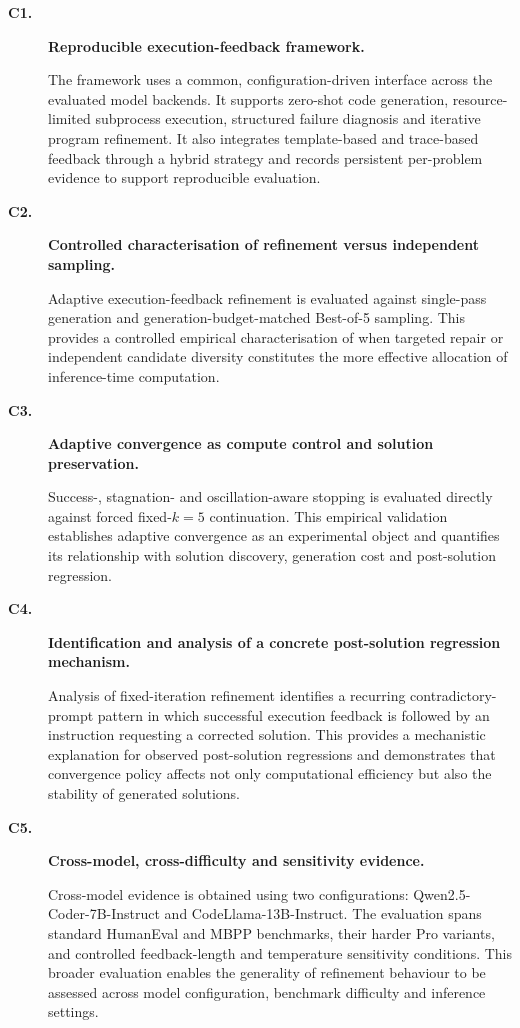 \begin{description}

\item[\textbf{C1.}] \textbf{Reproducible execution-feedback framework.}\par The framework uses a common, configuration-driven interface across the evaluated model backends. It supports zero-shot code generation, resource-limited subprocess execution, structured failure diagnosis and iterative program refinement. It also integrates template-based and trace-based feedback through a hybrid strategy and records persistent per-problem evidence to support reproducible evaluation.

\item[\textbf{C2.}] \textbf{Controlled characterisation of refinement versus independent sampling.}\par Adaptive execution-feedback refinement is evaluated against single-pass generation and generation-budget-matched Best-of-5 sampling. This provides a controlled empirical characterisation of when targeted repair or independent candidate diversity constitutes the more effective allocation of inference-time computation.

\item[\textbf{C3.}] \textbf{Adaptive convergence as compute control and solution preservation.}\par Success-, stagnation- and oscillation-aware stopping is evaluated directly against forced fixed-$k=5$ continuation. This empirical validation establishes adaptive convergence as an experimental object and quantifies its relationship with solution discovery, generation cost and post-solution regression.

\item[\textbf{C4.}] \textbf{Identification and analysis of a concrete post-solution regression mechanism.}\par Analysis of fixed-iteration refinement identifies a recurring contradictory-prompt pattern in which successful execution feedback is followed by an instruction requesting a corrected solution. This provides a mechanistic explanation for observed post-solution regressions and demonstrates that convergence policy affects not only computational efficiency but also the stability of generated solutions.

\item[\textbf{C5.}] \textbf{Cross-model, cross-difficulty and sensitivity evidence.}\par Cross-model evidence is obtained using two configurations: Qwen2.5-Coder-7B-Instruct and CodeLlama-13B-Instruct. The evaluation spans standard HumanEval and MBPP benchmarks, their harder Pro variants, and controlled feedback-length and temperature sensitivity conditions. This broader evaluation enables the generality of refinement behaviour to be assessed across model configuration, benchmark difficulty and inference settings.

\end{description}

